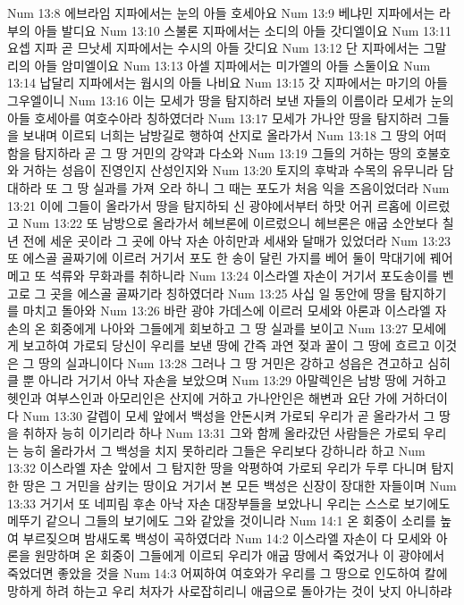 Num 13:8  에브라임 지파에서는 눈의 아들 호세아요
Num 13:9  베냐민 지파에서는 라부의 아들 발디요
Num 13:10  스불론 지파에서는 소디의 아들 갓디엘이요
Num 13:11  요셉 지파 곧 므낫세 지파에서는 수시의 아들 갓디요
Num 13:12  단 지파에서는 그말리의 아들 암미엘이요
Num 13:13  아셀 지파에서는 미가엘의 아들 스둘이요
Num 13:14  납달리 지파에서는 웝시의 아들 나비요
Num 13:15  갓 지파에서는 마기의 아들 그우엘이니
Num 13:16  이는 모세가 땅을 탐지하러 보낸 자들의 이름이라 모세가 눈의 아들 호세아를 여호수아라 칭하였더라
Num 13:17  모세가 가나안 땅을 탐지하러 그들을 보내며 이르되 너희는 남방길로 행하여 산지로 올라가서
Num 13:18  그 땅의 어떠함을 탐지하라 곧 그 땅 거민의 강약과 다소와
Num 13:19  그들의 거하는 땅의 호불호와 거하는 성읍이 진영인지 산성인지와
Num 13:20  토지의 후박과 수목의 유무니라 담대하라 또 그 땅 실과를 가져 오라 하니 그 때는 포도가 처음 익을 즈음이었더라
Num 13:21  이에 그들이 올라가서 땅을 탐지하되 신 광야에서부터 하맛 어귀 르홉에 이르렀고
Num 13:22  또 남방으로 올라가서 헤브론에 이르렀으니 헤브론은 애굽 소안보다 칠 년 전에 세운 곳이라 그 곳에 아낙 자손 아히만과 세새와 달매가 있었더라
Num 13:23  또 에스골 골짜기에 이르러 거기서 포도 한 송이 달린 가지를 베어 둘이 막대기에 꿰어 메고 또 석류와 무화과를 취하니라
Num 13:24  이스라엘 자손이 거기서 포도송이를 벤 고로 그 곳을 에스골 골짜기라 칭하였더라
Num 13:25  사십 일 동안에 땅을 탐지하기를 마치고 돌아와
Num 13:26  바란 광야 가데스에 이르러 모세와 아론과 이스라엘 자손의 온 회중에게 나아와 그들에게 회보하고 그 땅 실과를 보이고
Num 13:27  모세에게 보고하여 가로되 당신이 우리를 보낸 땅에 간즉 과연 젖과 꿀이 그 땅에 흐르고 이것은 그 땅의 실과니이다
Num 13:28  그러나 그 땅 거민은 강하고 성읍은 견고하고 심히 클 뿐 아니라 거기서 아낙 자손을 보았으며
Num 13:29  아말렉인은 남방 땅에 거하고 헷인과 여부스인과 아모리인은 산지에 거하고 가나안인은 해변과 요단 가에 거하더이다
Num 13:30  갈렙이 모세 앞에서 백성을 안돈시켜 가로되 우리가 곧 올라가서 그 땅을 취하자 능히 이기리라 하나
Num 13:31  그와 함께 올라갔던 사람들은 가로되 우리는 능히 올라가서 그 백성을 치지 못하리라 그들은 우리보다 강하니라 하고
Num 13:32  이스라엘 자손 앞에서 그 탐지한 땅을 악평하여 가로되 우리가 두루 다니며 탐지한 땅은 그 거민을 삼키는 땅이요 거기서 본 모든 백성은 신장이 장대한 자들이며
Num 13:33  거기서 또 네피림 후손 아낙 자손 대장부들을 보았나니 우리는 스스로 보기에도 메뚜기 같으니 그들의 보기에도 그와 같았을 것이니라
Num 14:1  온 회중이 소리를 높여 부르짖으며 밤새도록 백성이 곡하였더라
Num 14:2  이스라엘 자손이 다 모세와 아론을 원망하며 온 회중이 그들에게 이르되 우리가 애굽 땅에서 죽었거나 이 광야에서 죽었더면 좋았을 것을
Num 14:3  어찌하여 여호와가 우리를 그 땅으로 인도하여 칼에 망하게 하려 하는고 우리 처자가 사로잡히리니 애굽으로 돌아가는 것이 낫지 아니하랴
